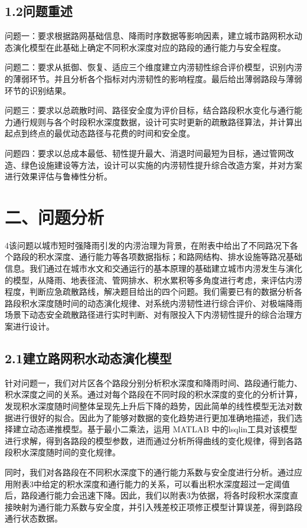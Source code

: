 \documentclass[UTF8,a4paper,12pt]{ctexart}
\begin{document}
\subsection{1.2问题重述}

问题一：要求根据路网基础信息、降雨时序数据等影响因素，建立城市路网积水动态演化模型在此基础上确定不同积水深度对应的路段的通行能力与安全程度。

问题二：要求从抵御、恢复、适应三个维度建立内涝韧性综合评价模型，识别内涝的薄弱环节。并且分析各个指标对内涝韧性的影响程度。最后给出薄弱路段与薄弱环节的识别结果。

问题三：要求以总疏散时间、路径安全度为评价目标，结合路段积水变化与通行能力通行规则与各个时段积水深度数据，设计可实时更新的疏散路径算法，并计算出起点到终点的最优动态路径与花费的时间和安全度。

问题四：要求以总成本最低、韧性提升最大、消退时间最短为目标，通过管网改造、绿色设施建设等方法，设计可以实施的内涝韧性提升综合改造方案，并对方案进行效果评估与鲁棒性分析。

\section{二、问题分析}

4该问题以城市短时强降雨引发的内涝治理为背景，在附表中给出了不同路况下各个路段的积水深度、通行能力等各项数据指标；和路网结构、排水设施等路况基础信息。我们通过在城市水文和交通运行的基本原理的基础建立城市内涝发生与演化的模型，从降雨、地表径流、管网排水、积水累积等多角度进行考虑，来评估内涝程度，判断应急疏散路线，解决题目给出的四个问题。我们需要已有的数据分析各路段积水深度随时间的动态演化规律、对系统内涝韧性进行综合评价、对极端降雨场景下动态安全疏散路径进行实时判断、对有限投入下内涝韧性提升的综合治理方案进行设计。

\subsection{2.1建立路网积水动态演化模型}

针对问题一，我们对片区各个路段分别分析积水深度和降雨时间、路段通行能力、积水深度之间的关系。通过对每个路段在不同时段的积水深度的变化的分析计算，发现积水深度随时间整体呈现先上升后下降的趋势，因此简单的线性模型无法对数据进行很好的拟合。因此为了能够对数据的变化趋势进行更加准确地描述，我们选择建立动态递推模型。基于最小二乘法，运用 MATLAB 中的lsqlin工具对该模型进行求解，得到各路段的模型参数，进而通过分析所得曲线的变化规律，得到各路段积水深度随时间的变化规律。

同时，我们对各路段在不同积水深度下的通行能力系数与安全度进行分析。通过应用附表3中给定的积水深度和通行能力的关系，可以看出积水深度超过一定阈值后，路段通行能力会迅速下降。因此，我们以附表3为依据，将各时段积水深度直接映射为通行能力系数与安全度，并引入残差校正项修正模型计算误差，得到路段通行状态数据。
\end{document}
